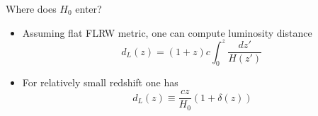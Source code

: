 \documentclass{beamer}
\newcommand{\second}{\mathrm{s}}
\begin{document}
\begin{frame}{Where does $H_0$ enter?}

\begin{itemize}
\item[] Assuming flat FLRW metric, one can compute luminosity distance
\begin{equation*}\label{Eq:luminosity-distance-the}
d_L(z) = (1+z) c \int_0^z \frac{dz'}{H(z')} \, 
\end{equation*}
\item[] For relatively small redshift one has
\begin{equation*}\label{Eq:luminosity-distance-the-small-z}
d_L(z) \equiv \frac{cz}{H_0}  ( 1+\delta(z)) %
\end{equation*}

\end{itemize}
\end{frame}
\end{document}
